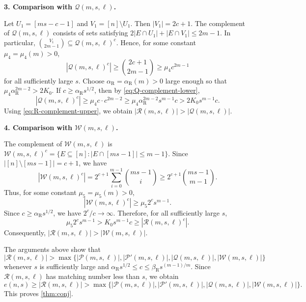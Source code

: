 \documentclass[10pt,a4paper]{article}
\numberwithin{equation}{section}
\theoremstyle{definition}
\begin{document}
\medskip
\noindent\textbf{3. Comparison with $\mathcal Q(m,s,\ell)$.}
\medskip

Let $U_1=[ms-c-1]$ and $V_1=[n]\setminus U_1$.
Then $|V_1|=2c+1$.
The complement of $\mathcal Q(m,s,\ell)$ consists of sets satisfying $2|E\cap U_1|+|E\cap V_1|\le2m-1$.
In particular, $\binom{V_1}{2m-1}\subseteq\mathcal Q(m,s,\ell)^c$.
Hence, for some constant $\mu_4=\mu_4(m)>0$,
\begin{equation}\label{eq:Q-complement-lower}
        |\mathcal Q(m,s,\ell)^c|
        \ge \binom{2c+1}{2m-1}
        \ge \mu_4c^{2m-1}
\end{equation}
for all sufficiently large $s$.
Choose $\alpha_{\mathrm R}=\alpha_{\mathrm R}(m)>0$ large enough so that $\mu_4\alpha_{\mathrm R}^{2m-2}>2K_0$.
If $c\ge\alpha_{\mathrm R}s^{1/2}$, then by \eqref{eq:Q-complement-lower},
\[
        |\mathcal Q(m,s,\ell)^c|
        \ge \mu_4c\cdot c^{2m-2}
        \ge \mu_4\alpha_{\mathrm R}^{2m-2}s^{m-1}c
        >2K_0s^{m-1}c.
\]
Using \eqref{eq:R-complement-upper}, we obtain $|\mathcal R(m,s,\ell)|>|\mathcal Q(m,s,\ell)|$.

\medskip
\noindent\textbf{4. Comparison with $\mathcal W(m,s,\ell)$.}
\medskip

The complement of $\mathcal W(m,s,\ell)$ is $\mathcal W(m,s,\ell)^c
        =\bigl\{E\subseteq[n]:|E\cap[ms-1]|\le m-1\bigr\}$.
Since $|[n]\setminus[ms-1]|=c+1$, we have
\[
        |\mathcal W(m,s,\ell)^c|
        =2^{c+1}\sum_{i=0}^{m-1}\binom{ms-1}{i}
        \ge2^{c+1}\binom{ms-1}{m-1}.
\]
Thus, for some constant $\mu_5=\mu_5(m)>0$,
\[
        |\mathcal W(m,s,\ell)^c|
        \ge \mu_5 2^cs^{m-1}.
\]
Since $c\ge\alpha_{\mathrm R}s^{1/2}$, we have $2^c/c\to\infty$.
Therefore, for all sufficiently large $s$,
\[
        \mu_5 2^cs^{m-1}>K_0s^{m-1}c
        \ge |\mathcal R(m,s,\ell)^c|.
\]
Consequently, $|\mathcal R(m,s,\ell)|>|\mathcal W(m,s,\ell)|$.

\medskip

The arguments above show that
\[
        |\mathcal R(m,s,\ell)|
        >
        \max\bigl\{
        |\mathcal P(m,s,\ell)|,
        |\mathcal P'(m,s,\ell)|,
        |\mathcal Q(m,s,\ell)|,
        |\mathcal W(m,s,\ell)|
        \bigr\}
\]
whenever $s$ is sufficiently large and $\alpha_{\mathrm R}s^{1/2}\le c\le\beta_{\mathrm R}s^{(m-1)/m}$.
Since $\mathcal R(m,s,\ell)$ has matching number less than $s$, we obtain
\[
        e(n,s)\ge |\mathcal R(m,s,\ell)|
        >
        \max\bigl\{
        |\mathcal P(m,s,\ell)|,
        |\mathcal P'(m,s,\ell)|,
        |\mathcal Q(m,s,\ell)|,
        |\mathcal W(m,s,\ell)|
        \bigr\}.
\]
This proves \cref{thm:conj}.
\end{document}
